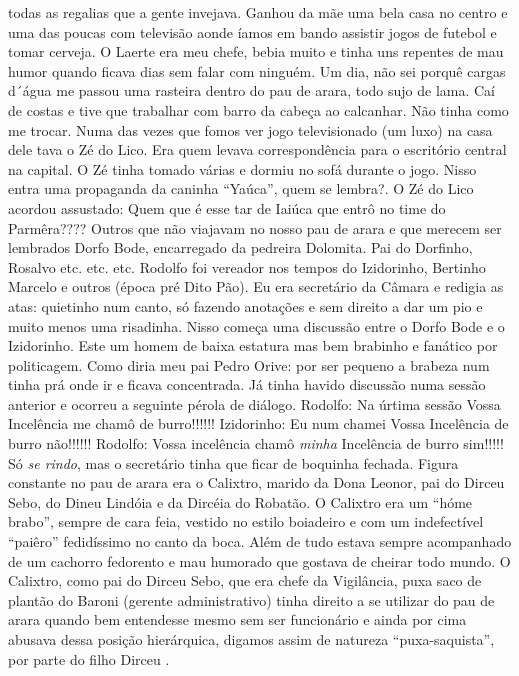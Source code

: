 \documentclass[12pt,brazil,]{book}
\begin{document}
todas as regalias que a gente invejava. Ganhou da mãe uma bela casa no
centro e uma das poucas com televisão aonde íamos em bando assistir
jogos de futebol e tomar cerveja. O Laerte era meu chefe, bebia muito e
tinha uns repentes de mau humor quando ficava dias sem falar com
ninguém. Um dia, não sei porquê cargas d´água me passou uma rasteira
dentro do pau de arara, todo sujo de lama. Caí de costas e tive que
trabalhar com barro da cabeça ao calcanhar. Não tinha como me trocar.
Numa das vezes que fomos ver jogo televisionado (um luxo) na casa dele
tava o Zé do Lico. Era quem levava correspondência para o escritório
central na capital. O Zé tinha tomado várias e dormiu no sofá durante o
jogo. Nisso entra uma propaganda da caninha ``Yaúca'', quem se lembra?.
O Zé do Lico acordou assustado: Quem que é esse tar de Iaiúca que entrô
no time do Parmêra???? Outros que não viajavam no nosso pau de arara e
que merecem ser lembrados Dorfo Bode, encarregado da pedreira Dolomita.
Pai do Dorfinho, Rosalvo etc. etc. etc. Rodolfo foi vereador nos tempos
do Izidorinho, Bertinho Marcelo e outros (época pré Dito Pão). Eu era
secretário da Câmara e redigia as atas: quietinho num canto, só fazendo
anotações e sem direito a dar um pio e muito menos uma risadinha. Nisso
começa uma discussão entre o Dorfo Bode e o Izidorinho. Este um homem de
baixa estatura mas bem brabinho e fanático por politicagem. Como diria
meu pai Pedro Orive: por ser pequeno a brabeza num tinha prá onde ir e
ficava concentrada. Já tinha havido discussão numa sessão anterior e
ocorreu a seguinte pérola de diálogo. Rodolfo: Na úrtima sessão Vossa
Incelência me chamô de burro!!!!!! Izidorinho: Eu num chamei Vossa
Incelência de burro não!!!!!! Rodolfo: Vossa incelência chamô
\emph{minha} Incelência de burro sim!!!!! Só \emph{se rindo}, mas o
secretário tinha que ficar de boquinha fechada. Figura constante no pau
de arara era o Calixtro, marido da Dona Leonor, pai do Dirceu Sebo, do
Dineu Lindóia e da Dircéia do Robatão. O Calixtro era um ``hóme brabo'',
sempre de cara feia, vestido no estilo boiadeiro e com um indefectível
``paiêro'' fedidíssimo no canto da boca. Além de tudo estava sempre
acompanhado de um cachorro fedorento e mau humorado que gostava de
cheirar todo mundo. O Calixtro, como pai do Dirceu Sebo, que era chefe
da Vigilância, puxa saco de plantão do Baroni (gerente administrativo)
tinha direito a se utilizar do pau de arara quando bem entendesse mesmo
sem ser funcionário e ainda por cima abusava dessa posição hierárquica,
digamos assim de natureza ``puxa-saquista'', por parte do filho Dirceu .
\end{document}
